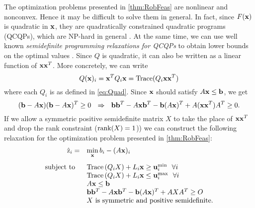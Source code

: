 

The optimization problems presented in \cref{thm:RobFeas} are nonlinear and nonconvex.
Hence it may be difficult to solve them in general.
In fact, since $F(\mathbf{x})$ is quadratic in $\mathbf{x}$, they are quadratically constrained quadratic programs (QCQPs), which are NP-hard in general \cite{PaBo2017}.
At the same time, we can use well known \emph{semidefinite programming relaxations for QCQPs} to obtain lower bounds on the optimal values \cite{VaBo1996}.
Since $Q$ is quadratic, it can also be written as a linear function of $\mathbf{x}\mathbf{x}^T$.
More concretely, we can write
$$Q(\mathbf{x})_i=\mathbf{x}^TQ_i\mathbf{x}=\operatorname{Trace}(Q_i\mathbf{x}\mathbf{x}^T)$$
where each $Q_i$ is as defined in \cref{eq:Quad}. 
Since $\mathbf{x}$ should satisfy $A\mathbf{x}\leq \mathbf{b}$, we get
\[
  (\mathbf{b}-A\mathbf{x})(\mathbf{b}-A\mathbf{x})^T \geq 0~~\Rightarrow~~ \mathbf{b}\mathbf{b}^T-A\mathbf{x}\mathbf{b}^T-\mathbf{b}(A\mathbf{x})^T+A(\mathbf{x}\mathbf{x}^T)A^T\geq 0.
\]
If we allow a symmetric positive semidefinite matrix $X$ to take the place of $\mathbf{x}\mathbf{x}^T$ and drop the rank constraint ($\operatorname{rank}(X)=1$)) we can construct the following relaxation for the optimization problem presented in \cref{thm:RobFeas}:
% 
\begin{equation}\label{eq:OPTfeasrelax}
  \begin{array}{rl}
    \hat{\rz}_{i} = & \min\limits_{\vx}  b_i-(A\vx)_i  \\
    \vspace*{-0.05in} \\
    \text{subject to } \ & \Tr\left(Q_iX\right)+ L_i\vx \geq \vu_i^{\min} \ \ \forall i\\
    & \Tr\left(Q_iX\right)+ L_i\vx \leq \vu_i^{\max} \ \ \forall i\\
    &A\vx\leq \vb \\
    &\vb\vb^T-A\vx\vb^T-\vb(A\vx)^T+AXA^T\geq O \\
    &X \text{ is symmetric and positive semidefinite.}
  \end{array}
\end{equation}
